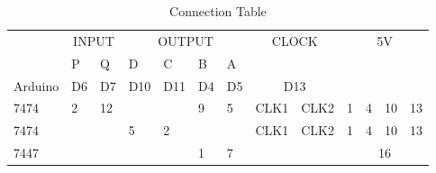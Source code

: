 \documentclass[journal,12pt,twocolumn]{IEEEtran}
\begin{document}
\centering
\begin{table}[h!]
\large
\begin{tabular}{|l|ll|llll|cl|clll|}
\hline
\multirow{2}{*}{} & \multicolumn{2}{c|}{INPUT}   & \multicolumn{4}{c|}{OUTPUT}                                                      & \multicolumn{2}{c|}{\multirow{2}{*}{CLOCK}} & \multicolumn{4}{c|}{\multirow{3}{*}{5V}}                                       \\ \cline{2-7}
                  & \multicolumn{1}{l|}{P}   & Q  &  \multicolumn{1}{l|}{D}  & \multicolumn{1}{l|}{C}  & \multicolumn{1}{l|}{B}  & A  & \multicolumn{2}{c|}{}                       & \multicolumn{4}{c|}{}                                                          \\ \cline{1-9}
Arduino           & \multicolumn{1}{l|}{D6} & D7 & \multicolumn{1}{l|}{D10} & \multicolumn{1}{l|}{D11} & \multicolumn{1}{l|}{D4} & D5 & \multicolumn{2}{c|}{D13}                    & \multicolumn{4}{c|}{}                                                          \\ \hline
7474              & \multicolumn{1}{l|}{2}  & 12 & \multicolumn{1}{l|}{}   & \multicolumn{1}{l|}{}   & \multicolumn{1}{l|}{9}  & 5  & \multicolumn{1}{l|}{CLK1}       & CLK2      & \multicolumn{1}{l|}{1} & \multicolumn{1}{l|}{4} & \multicolumn{1}{l|}{10} & 13 \\ \hline
7474              & \multicolumn{1}{l|}{}  &  & \multicolumn{1}{l|}{5}   &  \multicolumn{1}{l|}{2}   & \multicolumn{1}{l|}{}  &    & \multicolumn{1}{l|}{CLK1}       & CLK2      & \multicolumn{1}{l|}{1} & \multicolumn{1}{l|}{4} & \multicolumn{1}{l|}{10} & 13 \\ \hline
7447              & \multicolumn{1}{l|}{}   &    & \multicolumn{1}{l|}{}   & \multicolumn{1}{l|}{}   & \multicolumn{1}{l|}{1}  & 7  & \multicolumn{1}{l|}{}           &           & \multicolumn{4}{c|}{16}                                                        \\ \hline
\end{tabular}
\centering
\caption{Connection Table}
\label{table:2}
\end{table}
\end{document}
